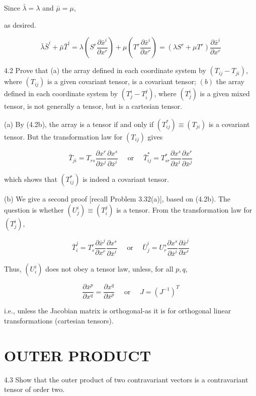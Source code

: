 \documentclass[10pt]{article}
\begin{document}
Since $\bar{\lambda}=\lambda$ and $\bar{\mu}=\mu$,

as desired.

$$
\bar{\lambda} \bar{S}^{i}+\bar{\mu} \bar{T}^{i}=\lambda\left(S^{r} \frac{\partial \bar{x}^{i}}{\partial x^{r}}\right)+\mu\left(T^{r} \frac{\partial \bar{x}^{i}}{\partial x^{r}}\right)=\left(\lambda S^{r}+\mu T^{r}\right) \frac{\partial \bar{x}^{i}}{\partial x^{r}}
$$

4.2 Prove that (a) the array defined in each coordinate system by $\left(T_{i j}-T_{j i}\right)$, where $\left(T_{i j}\right)$ is a given covariant tensor, is a covariant tensor; $(b)$ the array defined in each coordinate system by $\left(T_{j}^{i}-T_{i}^{j}\right)$, where $\left(T_{j}^{i}\right)$ is a given mixed tensor, is not generally a tensor, but is a cartesian tensor.

(a) By (4.2b), the array is a tensor if and only if $\left(T_{i j}^{*}\right) \equiv\left(T_{j i}\right)$ is a covariant tensor. But the transformation law for $\left(T_{i j}\right)$ gives

$$
\bar{T}_{j i}=T_{r s} \frac{\partial x^{r}}{\partial \bar{x}^{j}} \frac{\partial x^{s}}{\partial \bar{x}^{i}} \quad \text { or } \quad \bar{T}_{i j}^{*}=T_{s r}^{*} \frac{\partial x^{s}}{\partial \bar{x}^{i}} \frac{\partial x^{r}}{\partial \bar{x}^{j}}
$$

which shows that $\left(T_{i j}^{*}\right)$ is indeed a covariant tensor.

(b) We give a second proof [recall Problem 3.32(a)], based on (4.2b). The question is whether $\left(U_{j}^{i}\right) \equiv\left(T_{i}^{j}\right)$ is a tensor. From the transformation law for $\left(T_{j}^{i}\right)$,

$$
\bar{T}_{i}^{j}=T_{s}^{r} \frac{\partial \bar{x}^{j}}{\partial x^{r}} \frac{\partial x^{s}}{\partial \bar{x}^{i}} \quad \text { or } \quad \bar{U}_{j}^{i}=U_{r}^{s} \frac{\partial x^{s}}{\partial \bar{x}^{i}} \frac{\partial \bar{x}^{j}}{\partial x^{r}}
$$

Thus, $\left(U_{i}^{i}\right)$ does not obey a tensor law, unless, for all $p, q$,

$$
\frac{\partial \bar{x}^{p}}{\partial x^{q}}=\frac{\partial x^{q}}{\partial \bar{x}^{p}} \quad \text { or } \quad J=\left(J^{-1}\right)^{T}
$$

i.e., unless the Jacobian matrix is orthogonal-as it is for orthogonal linear transformations (cartesian tensors).

\section*{OUTER PRODUCT}
4.3 Show that the outer product of two contravariant vectors is a contravariant tensor of order two.
\end{document}
